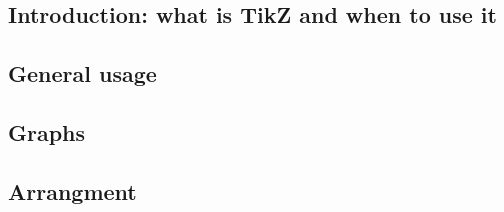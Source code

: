 
\graphicspath{{sec01/images/}{sec01/code/}}
\lstset{inputpath=sec01/code/}

\subsection{Introduction: what is TikZ and when to use it}


\subsection{General usage}


\subsection{Graphs}


\subsection{Arrangment}




